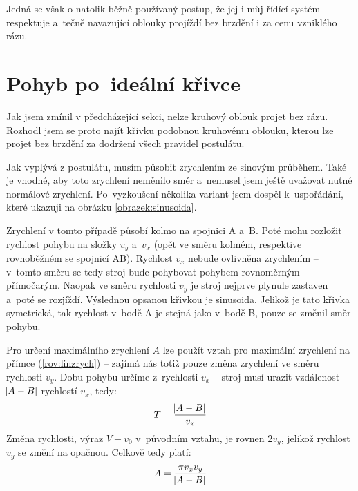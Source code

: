 		Jedná se však o natolik běžně používaný postup, že jej i můj řídící systém respektuje a~tečně navazující oblouky projíždí bez brzdění i za cenu vzniklého rázu.
	
	\section{Pohyb po~ideální křivce}\label{kap:krivka}
		Jak jsem zmínil v předcházející sekci, nelze kruhový oblouk projet bez rázu. Rozhodl jsem se proto najít křivku podobnou kruhovému oblouku, kterou lze projet bez brzdění za dodržení všech pravidel postulátu. 
		
		Jak vyplývá z postulátu, musím působit zrychlením ze sinovým průběhem. Také je vhodné, aby toto zrychlení neměnilo směr a~nemusel jsem ještě uvažovat nutné normálové zrychlení. Po~vyzkoušení několika variant jsem dospěl k~uspořádání, které ukazuji na obrázku \ref{obrazek:sinusoida}.
		
		Zrychlení v tomto případě působí kolmo na spojnici A a~B. Poté mohu rozložit rychlost pohybu na složky $v_y$ a~$v_x$ (opět ve směru kolmém, respektive rovnoběžném se spojnicí AB). Rychlost $v_x$ nebude ovlivněna zrychlením -- v~tomto směru se tedy stroj bude pohybovat pohybem rovnoměrným přímočarým. Naopak ve směru rychlosti $v_y$ je stroj nejprve plynule zastaven a~poté se rozjíždí. Výslednou opsanou křivkou je sinusoida. Jelikož je tato křivka symetrická, tak rychlost v~bodě A je stejná jako v~bodě B, pouze se změnil směr pohybu.
		
		Pro určení maximálního zrychlení $A$ lze použít vztah pro maximální zrychlení na přímce (\ref{rov:linzrych}) -- zajímá nás totiž pouze změna zrychlení ve směru rychlosti $v_y$. Dobu pohybu určíme z~rychlosti $v_x$ -- stroj musí urazit vzdálenost $\abs{A-B}$ rychlostí $v_x$, tedy:
		\begin{equation}
			T = \frac{\abs{A-B}}{v_x}
		\end{equation}
		Změna rychlosti, výraz $V-v_0$ v~původním vztahu, je rovnen $2v_y$, jelikož rychlost $v_y$ se změní na opačnou. Celkově tedy platí:
		\begin{equation}
			A = \frac{\pi v_xv_y}{\abs{A-B}}
		\end{equation}
		
